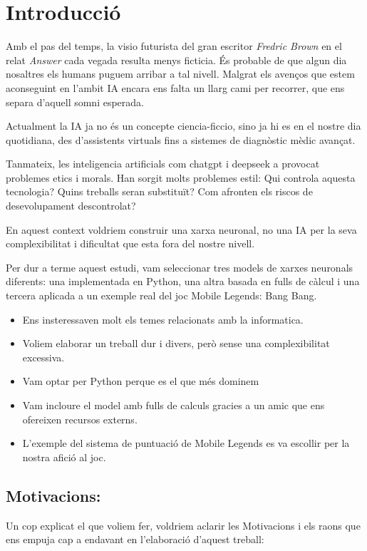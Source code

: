 \chapter{Introducció}
\label{c:intro}

Amb el pas del temps, la visio futurista del gran escritor \textit{Fredric Brown} en el relat \emph{Answer} cada vegada resulta menys ficticia. És probable de que algun dia nosaltres els humans puguem arribar a tal nivell. Malgrat els avenços que estem aconseguint en l'ambit IA encara ens falta un llarg cami per recorrer, que ens separa d'aquell somni esperada.

Actualment la IA ja no és un concepte ciencia-ficcio, sino ja hi es en el nostre dia quotidiana, des d’assistents virtuals fins a sistemes de diagnòstic mèdic avançat.

Tanmateix, les inteligencia artificials com chatgpt i deepseek a provocat problemes etics i morals. Han sorgit molts problemes estil: Qui controla aquesta tecnologia? Quins treballs seran substituït? Com afronten els riscos de desevolupament descontrolat?

En aquest context voldriem construir una xarxa neuronal, no una IA per la seva complexibilitat i dificultat que esta fora del nostre nivell.

Per dur a terme aquest estudi, vam seleccionar tres models de xarxes neuronals diferents: una implementada en Python, una altra basada en fulls de càlcul i una tercera aplicada a un exemple real del joc Mobile Legends: Bang Bang.

\begin{itemize}
 \item Ens insteressaven molt els temes relacionats amb la informatica.
 \item Voliem elaborar un treball dur i divers, però sense una complexibilitat excessiva.
 \item Vam optar per Python perque es el que més dominem
 \item Vam incloure el model amb fulls de calculs gracies a un amic que ens ofereixen recursos externs.
 \item L’exemple del sistema de puntuació de Mobile Legends es va escollir per la nostra afició al joc.
\end{itemize}

\section{Motivacions:}
Un cop explicat el que voliem fer, voldriem aclarir les Motivacions i els raons que ens empuja cap a endavant en l'elaboració d'aquest treball:

